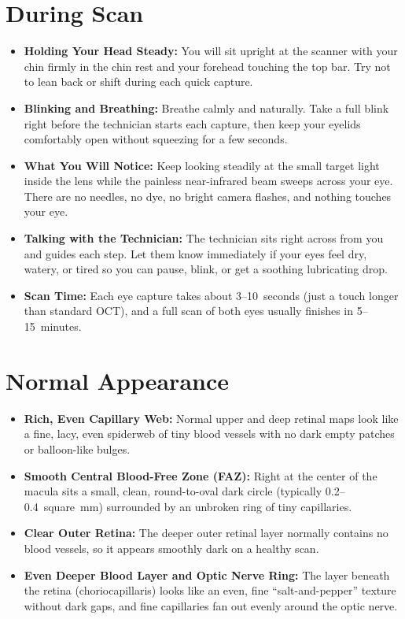 \section{During Scan}
\begin{itemize}
\item \textbf{Holding Your Head Steady:} You will sit upright at the scanner with your chin firmly in the chin rest and your forehead touching the top bar. Try not to lean back or shift during each quick capture.
\item \textbf{Blinking and Breathing:} Breathe calmly and naturally. Take a full blink right before the technician starts each capture, then keep your eyelids comfortably open without squeezing for a few seconds.
\item \textbf{What You Will Notice:} Keep looking steadily at the small target light inside the lens while the painless near-infrared beam sweeps across your eye. There are no needles, no dye, no bright camera flashes, and nothing touches your eye.
\item \textbf{Talking with the Technician:} The technician sits right across from you and guides each step. Let them know immediately if your eyes feel dry, watery, or tired so you can pause, blink, or get a soothing lubricating drop.
\item \textbf{Scan Time:} Each eye capture takes about 3--10~seconds (just a touch longer than standard OCT), and a full scan of both eyes usually finishes in 5--15~minutes.
\end{itemize}

\section{Normal Appearance}
\begin{itemize}
\item \textbf{Rich, Even Capillary Web:} Normal upper and deep retinal maps look like a fine, lacy, even spiderweb of tiny blood vessels with no dark empty patches or balloon-like bulges.
\item \textbf{Smooth Central Blood-Free Zone (FAZ):} Right at the center of the macula sits a small, clean, round-to-oval dark circle (typically 0.2--0.4~square~mm) surrounded by an unbroken ring of tiny capillaries.
\item \textbf{Clear Outer Retina:} The deeper outer retinal layer normally contains no blood vessels, so it appears smoothly dark on a healthy scan.
\item \textbf{Even Deeper Blood Layer and Optic Nerve Ring:} The layer beneath the retina (choriocapillaris) looks like an even, fine ``salt-and-pepper'' texture without dark gaps, and fine capillaries fan out evenly around the optic nerve.
\end{itemize}

